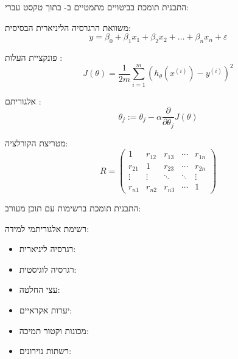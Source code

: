 \documentclass{hebrew-academic-template}
\begin{document}



התבנית תומכת בביטויים מתמטיים ב- בתוך טקסט עברי:

משוואת הרגרסיה הליניארית הבסיסית:
\begin{equation}
y = \beta_0 + \beta_1 x_1 + \beta_2 x_2 + \ldots + \beta_n x_n + \varepsilon
\end{equation}

פונקציית העלות :
\begin{equation}
J(\theta) = \frac{1}{2m} \sum_{i=1}^{m}(h_\theta(x^{(i)}) - y^{(i)})^2
\end{equation}


אלגוריתם :
\begin{equation}
\theta_j := \theta_j - \alpha \frac{\partial}{\partial \theta_j} J(\theta)
\end{equation}

מטריצת הקורלציה:
\begin{equation}
R = \begin{pmatrix}
1 & r_{12} & r_{13} & \cdots & r_{1n} \\
r_{21} & 1 & r_{23} & \cdots & r_{2n} \\
\vdots & \vdots & \ddots & \ddots & \vdots \\
r_{n1} & r_{n2} & r_{n3} & \cdots & 1
\end{pmatrix}
\end{equation}




התבנית תומכת ברשימות עם תוכן מעורב:

רשימת אלגוריתמי למידה:
\begin{itemize}
\item רגרסיה ליניארית: 
\item רגרסיה לוגיסטית:   
\item עצי החלטה: 
\item יערות אקראיים: 
\item מכונות וקטור תמיכה: 
\item רשתות נוירונים: 
\end{itemize}
\end{document}
